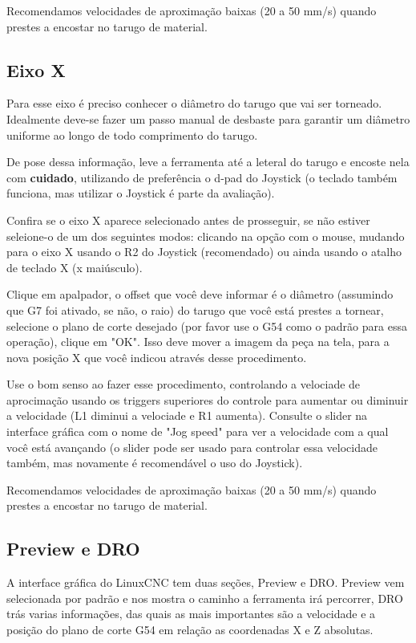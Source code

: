 \documentclass[twoside,a4paper]{refart}
\begin{document}
\attention Recomendamos velocidades de aproximação baixas (20 a 50 mm/s) quando prestes a encostar no tarugo de material.

\subsection{Eixo X}

Para esse eixo é preciso conhecer o diâmetro do tarugo que vai ser torneado. Idealmente deve-se fazer um passo manual de desbaste para garantir um diâmetro uniforme ao longo de todo comprimento do tarugo.

De pose dessa informação, leve a ferramenta até a leteral do tarugo e encoste nela com \textbf{cuidado}, utilizando de preferência o d-pad do Joystick (o teclado também funciona, mas utilizar o Joystick é parte da avaliação). 

Confira se o eixo X aparece selecionado antes de prosseguir, se não estiver seleione-o de um dos seguintes modos: clicando na opção com o mouse, mudando para o eixo X usando o R2 do Joystick (recomendado) ou ainda usando o atalho de teclado X (x maiúsculo).

Clique em apalpador, o offset que você deve informar é o diâmetro (assumindo que G7 foi ativado, se não, o raio) do tarugo que você está prestes a tornear, selecione o plano de corte desejado (por favor use o G54 como o padrão para essa operação), clique em "OK". Isso deve mover a imagem da peça na tela, para a nova posição X que você indicou através desse procedimento.

\attention Use o bom senso ao fazer esse procedimento, controlando a velociade de aprocimação usando os triggers superiores do controle para aumentar ou diminuir a velocidade (L1 diminui a velociade e R1 aumenta). Consulte o slider na interface gráfica com o nome de "Jog speed" para ver a velocidade com a qual você está avançando (o slider pode ser usado para controlar essa velocidade também, mas novamente é recomendável o uso do Joystick). 

\attention Recomendamos velocidades de aproximação baixas (20 a 50 mm/s) quando prestes a encostar no tarugo de material.

\subsection{Preview e DRO}

A interface gráfica do LinuxCNC tem duas seções, Preview e DRO. Preview vem selecionada por padrão e nos mostra o caminho a ferramenta irá percorrer, DRO trás varias informações, das quais as mais importantes são a velocidade e a posição do plano de corte G54 em relação as coordenadas X e Z absolutas.
\end{document}
